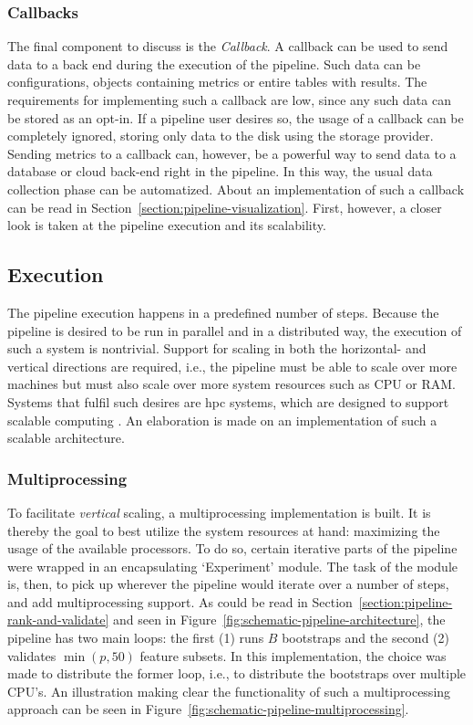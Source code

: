 \documentclass[../main.tex]{subfiles}
\begin{document}
\subsubsection{Callbacks}\label{section:pipeline-callbacks}
The final component to discuss is the \textit{Callback}. A callback can be used to send data to a back end during the execution of the pipeline. Such data can be configurations, objects containing metrics or entire tables with results. The requirements for implementing such a callback are low, since any such data can be stored as an opt-in. If a pipeline user desires so, the usage of a callback can be completely ignored, storing only data to the disk using the storage provider. Sending metrics to a callback can, however, be a powerful way to send data to a database or cloud back-end right in the pipeline. In this way, the usual data collection phase can be automatized. About an implementation of such a callback can be read in Section~\ref{section:pipeline-visualization}. First, however, a closer look is taken at the pipeline execution and its scalability.





\subsection{Execution}\label{section:pipeline-execution}
The pipeline execution happens in a predefined number of steps. Because the pipeline is desired to be run in parallel and in a distributed way, the execution of such a system is nontrivial. Support for scaling in both the horizontal- and vertical directions are required, i.e., the pipeline must be able to scale over more machines but must also scale over more system resources such as CPU or RAM. Systems that fulfil such desires are \gls{hpc} systems, which are designed to support scalable computing \citep{ristov_superlinear_2016}. An elaboration is made on an implementation of such a scalable architecture.




\subsubsection{Multiprocessing}
To facilitate \textit{vertical} scaling, a multiprocessing implementation is built. It is thereby the goal to best utilize the system resources at hand: maximizing the usage of the available processors. To do so, certain iterative parts of the pipeline were wrapped in an encapsulating `Experiment' module. The task of the module is, then, to pick up wherever the pipeline would iterate over a number of steps, and add multiprocessing support. As could be read in Section~\ref{section:pipeline-rank-and-validate} and seen in Figure~\ref{fig:schematic-pipeline-architecture}, the pipeline has two main loops: the first (1) runs $B$ bootstraps and the second (2) validates $\min (p, 50)$ feature subsets. In this implementation, the choice was made to distribute the former loop, i.e., to distribute the bootstraps over multiple CPU's. An illustration making clear the functionality of such a multiprocessing approach can be seen in Figure~\ref{fig:schematic-pipeline-multiprocessing}.
\end{document}
